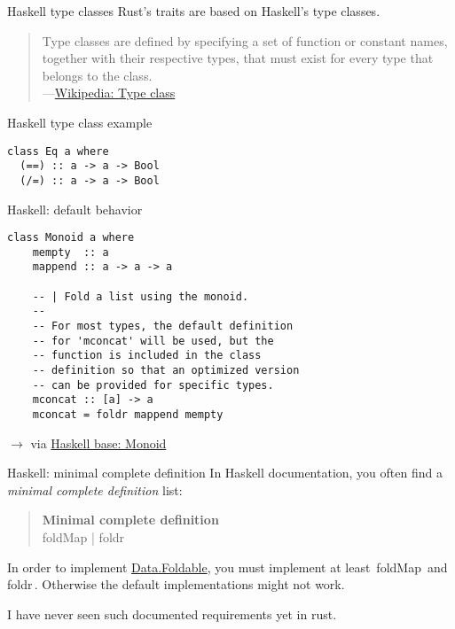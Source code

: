 \documentclass{beamer}
\newcommand\code[1]{\,{\color[HTML]{884400}#1}\,}
\newcommand\source[1]{$\rightarrow$ via #1}
\begin{document}
\begin{frame}[fragile]{Haskell type classes}
  Rust's traits are based on Haskell's type classes.

  \begin{quote}
    Type classes are defined by specifying a set of function or constant names, together with their respective types, that must exist for every type that belongs to the class. \\
    ---\href{https://en.wikipedia.org/wiki/Type_class}{Wikipedia: Type class}
  \end{quote}
\end{frame}

\begin{frame}[fragile]{Haskell type class example}
  \begin{verbatim}
class Eq a where
  (==) :: a -> a -> Bool
  (/=) :: a -> a -> Bool
  \end{verbatim}
\end{frame}

\begin{frame}[fragile]{Haskell: default behavior}
  \begin{verbatim}
class Monoid a where
    mempty  :: a
    mappend :: a -> a -> a

    -- | Fold a list using the monoid.
    --
    -- For most types, the default definition
    -- for 'mconcat' will be used, but the
    -- function is included in the class
    -- definition so that an optimized version
    -- can be provided for specific types.
    mconcat :: [a] -> a
    mconcat = foldr mappend mempty
  \end{verbatim}
  \source{\href{https://hackage.haskell.org/package/base-4.12.0.0/docs/src/GHC.Base.html\#Monoid}{Haskell base: Monoid}}
\end{frame}

\begin{frame}[fragile]{Haskell: minimal complete definition}
  In Haskell documentation, you often find a \emph{minimal complete definition} list:

  \vspace{20pt}
  \begin{quote}
    \textbf{Minimal complete definition} \\
    foldMap | foldr
  \end{quote}

  In order to implement \href{https://hackage.haskell.org/package/base-4.12.0.0/docs/Data-Foldable.html}{Data.Foldable}, you must implement at least \code{foldMap} and \code{foldr}. Otherwise the default implementations might not work.

  I have never seen such documented requirements yet in rust.
\end{frame}
\end{document}
